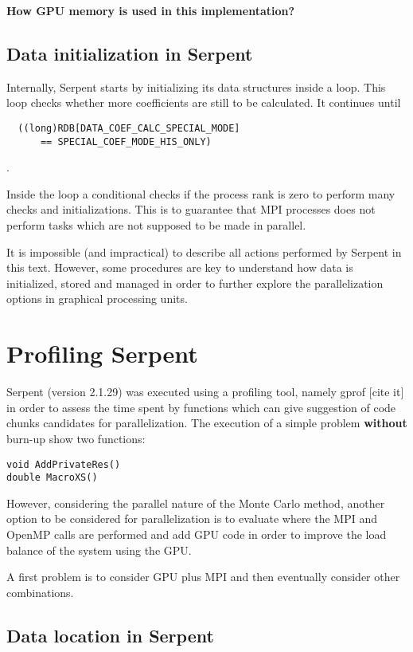 \documentclass[twoside,a4paper,12pt,english]{anstrans}
\begin{document}
\textbf{How GPU memory is used in this implementation?}

\subsection{Data initialization in Serpent}
Internally, Serpent starts by initializing its data structures inside a loop. This loop checks
whether more coefficients are still to be calculated. It continues until \begin{verbatim}
  ((long)RDB[DATA_COEF_CALC_SPECIAL_MODE]
      == SPECIAL_COEF_MODE_HIS_ONLY)
\end{verbatim}.

Inside the loop a conditional checks if the process rank is zero to perform many checks and initializations.
This is to guarantee that MPI processes does not perform tasks which are not supposed to be made in parallel.

It is impossible (and impractical) to describe all actions performed by Serpent in this text. However, some
procedures are key to understand how data is initialized, stored and managed in order to further explore
the parallelization options in graphical processing units.

\section{Profiling Serpent}

Serpent (version 2.1.29) was executed using a profiling tool, namely gprof [cite it] in order
to assess the time spent by functions which can give suggestion of code chunks candidates for
parallelization. The execution of a simple problem \textbf{without} burn-up show two functions:
\begin{verbatim}
void AddPrivateRes()
double MacroXS()
\end{verbatim}
However, considering the parallel nature of the Monte Carlo method, another option to be considered
for parallelization is to evaluate where the MPI and OpenMP calls are performed and add GPU code
in order to improve the load balance of the system using the GPU.

A first problem is to consider GPU plus MPI and then eventually consider other combinations.

\subsection{Data location in Serpent}
\end{document}
